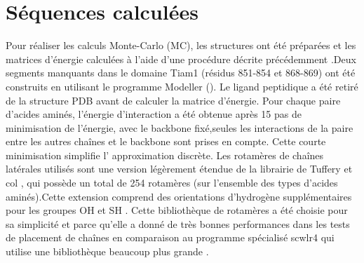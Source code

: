 %   
%   
%


\section{Séquences calculées}

Pour réaliser les calculs Monte-Carlo (MC), les structures ont été préparées et les matrices d'énergie calculées à l'aide d'une procédure décrite précédemment \cite{Schmidt09,Schmidt10}.Deux segments manquants dans le domaine Tiam1 (résidus 851-854 et 868-869) ont été construits en utilisant le programme Modeller (\cite{Modeller}). Le ligand peptidique a été retiré de la structure PDB avant de calculer la matrice d'énergie. Pour chaque paire d'acides aminés, l'énergie d'interaction a été obtenue après 15 pas de minimisation de l'énergie, avec le backbone fixé,seules les interactions de la paire entre les autres chaînes et le backbone sont prises en compte. Cette courte minimisation simplifie l' approximation discrète. Les rotamères de chaînes latérales utilisés sont une version légèrement étendue de la librairie de Tuffery et col \cite{Tuffery91}, qui possède un total de 254 rotamères (sur l'ensemble des types d'acides aminés).Cette extension comprend des orientations d'hydrogène supplémentaires pour les groupes OH et SH \cite{Gaillard14}. Cette bibliothèque de rotamères a été choisie pour sa simplicité et parce qu'elle a donné de très bonnes performances dans les tests de placement de chaînes en comparaison au programme spécialisé scwlr4 qui utilise une bibliothèque beaucoup plus grande \cite{Krivov09,Gaillard16}.



